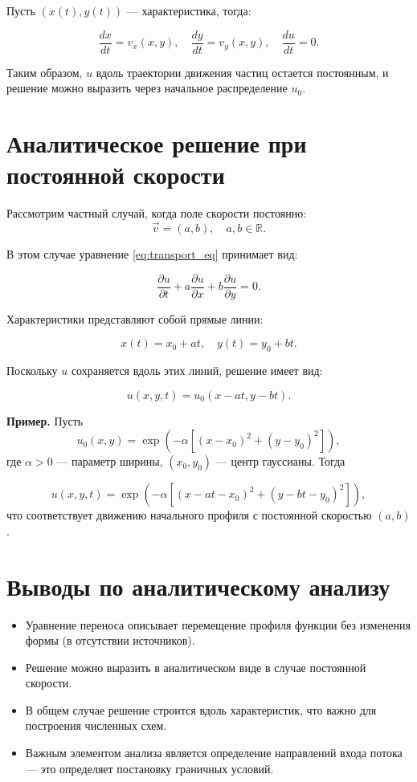Пусть $(x(t), y(t))$ — характеристика, тогда:

\begin{equation}
	\frac{dx}{dt} = v_x(x, y), \quad \frac{dy}{dt} = v_y(x, y), \quad \frac{du}{dt} = 0.
	\label{eq:characteristics}
\end{equation}

Таким образом, $u$ вдоль траектории движения частиц остается постоянным, и решение можно выразить через начальное распределение $u_0$.

\section{Аналитическое решение при постоянной скорости}

Рассмотрим частный случай, когда поле скорости постоянно:
\[
\vec{v} = (a, b), \quad a, b \in \mathbb{R}.
\]

В этом случае уравнение \eqref{eq:transport_eq} принимает вид:

\begin{equation}
	\frac{\partial u}{\partial t} + a \frac{\partial u}{\partial x} + b \frac{\partial u}{\partial y} = 0.
	\label{eq:const_velocity}
\end{equation}

Характеристики представляют собой прямые линии:

\[
x(t) = x_0 + at, \quad y(t) = y_0 + bt.
\]

Поскольку $u$ сохраняется вдоль этих линий, решение имеет вид:

\begin{equation}
	u(x, y, t) = u_0(x - at, y - bt).
	\label{eq:analytical_solution}
\end{equation}

\textbf{Пример.} Пусть
\[
u_0(x, y) = \exp\left(-\alpha[(x - x_0)^2 + (y - y_0)^2]\right),
\]
где $\alpha > 0$ — параметр ширины, $(x_0, y_0)$ — центр гауссианы. Тогда

\begin{equation}
	u(x, y, t) = \exp\left(-\alpha[(x - at - x_0)^2 + (y - bt - y_0)^2]\right),
\end{equation}
что соответствует движению начального профиля с постоянной скоростью $(a, b)$.

\section{Выводы по аналитическому анализу}

\begin{itemize}
	\item Уравнение переноса описывает перемещение профиля функции без изменения формы (в отсутствии источников).
	\item Решение можно выразить в аналитическом виде в случае постоянной скорости.
	\item В общем случае решение строится вдоль характеристик, что важно для построения численных схем.
	\item Важным элементом анализа является определение направлений входа потока — это определяет постановку граничных условий.
\end{itemize}
